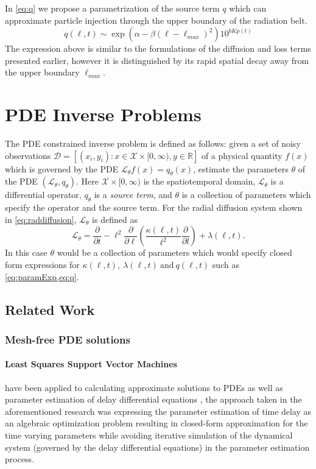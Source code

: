 In \cref{eq:q} we propose a parametrization of the source term $q$ which can approximate particle 
injection through the upper boundary of the radiation belt. 
%
\begin{equation}\label{eq:q}
q(\ell,t)  \sim \exp(\alpha - \beta (\ell - \ell_{max})^2) 10^{b Kp(t)}
\end{equation}
%
The expression above is similar to the formulations of the diffusion and loss terms presented 
earlier, however it is distinguished by its rapid spatial decay away from the upper boundary 
$\ell_{max}$.  

\section{PDE Inverse Problems}\label{sec:inv}

The PDE constrained inverse problem is defined as follows: given a set of noisy observations 
$\mathcal{D} = \left[ (x_i, y_i): x \in \mathcal{X} \times [0, \infty), y \in \mathbb{R} \right]$ 
of a physical quantity $f(x)$ which is governed by the PDE 
$\mathcal{L}_{\theta} f(x) = q_{\theta}(x)$, estimate the parameters $\theta$ of the PDE 
$(\mathcal{L}_{\theta}, q_{\theta})$. Here $\mathcal{X} \times [0, \infty)$ is the spatiotemporal 
domain, $\mathcal{L}_{\theta}$ is a differential operator, $q_{\theta}$ is a \emph{source term}, 
and $\theta$ is a collection of parameters which specify the operator and the source term.
%
For the radial diffusion system shown in \cref{eq:raddiffusion}, $\mathcal{L}_{\theta}$ is defined 
as   
%
\[
  \mathcal{L}_{\theta} =
    \frac{\partial}{\partial{t}} - 
    \ell^2 \frac{\partial}{\partial{\ell}}\left( 
      \frac{\kappa(\ell, t)}{\ell^{2}} \frac{\partial}{\partial{l}} 
    \right) + 
    \lambda(\ell,t).  
\] 
%
In this case $\theta$ would be a collection of parameters which would specify closed form 
expressions for $\kappa(\ell, t), \ \lambda(\ell,t) \ \text{and} \ q(\ell,t)$ such as 
\cref{eq:paramExp,eq:q}.

\subsection{Related Work}

\subsubsection*{Mesh-free PDE solutions}

\paragraph{Least Squares Support Vector Machines} have been applied to calculating 
approximate solutions to PDEs \citep{MEHRKANOON2015105,MEHRKANOON20122502} as well as parameter 
estimation of delay differential equations \citep{MEHRKANOON2014830}, the approach taken in the 
aforementioned research \citep{MEHRKANOON2014830} was expressing the parameter estimation of time 
delay as an algebraic optimization problem resulting in closed-form approximation for the time 
varying parameters while avoiding iterative simulation of the dynamical system (governed by the 
delay differential equations) in the parameter estimation process.

